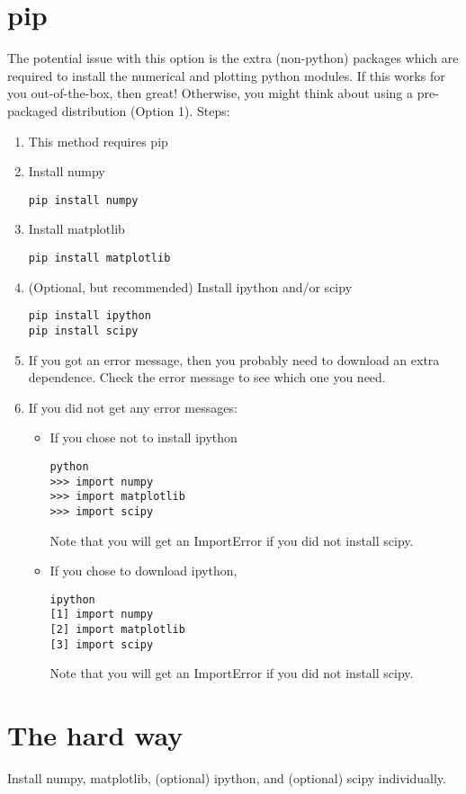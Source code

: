\documentclass[11pt]{article}
\begin{document}
\section{pip}
\label{sec-2}
The potential issue with this option is the extra (non-python) packages which are required to install the numerical and plotting python modules. If this works for you out-of-the-box, then great! Otherwise, you might think about using a pre-packaged distribution (Option 1). Steps:
\begin{enumerate}
\item This method requires pip
\item Install numpy
\begin{verbatim}
pip install numpy
\end{verbatim}
\item Install matplotlib
\begin{verbatim}
pip install matplotlib
\end{verbatim}
\item (Optional, but recommended) Install ipython and/or scipy
\begin{verbatim}
pip install ipython
pip install scipy
\end{verbatim}
\item If you got an error message, then you probably need to download an extra dependence. Check the error message to see which one you need.
\item If you did not get any error messages:
\begin{itemize}
\item If you chose not to install ipython
\begin{verbatim}
python
>>> import numpy
>>> import matplotlib
>>> import scipy
\end{verbatim}
Note that you will get an ImportError if you did not install scipy.
\item If you chose to download ipython,
\begin{verbatim}
ipython
[1] import numpy
[2] import matplotlib
[3] import scipy
\end{verbatim}
Note that you will get an ImportError if you did not install scipy.
\end{itemize}
\end{enumerate}
\section{The hard way}
\label{sec-3}
Install numpy, matplotlib, (optional) ipython, and (optional) scipy individually. 
\end{document}
